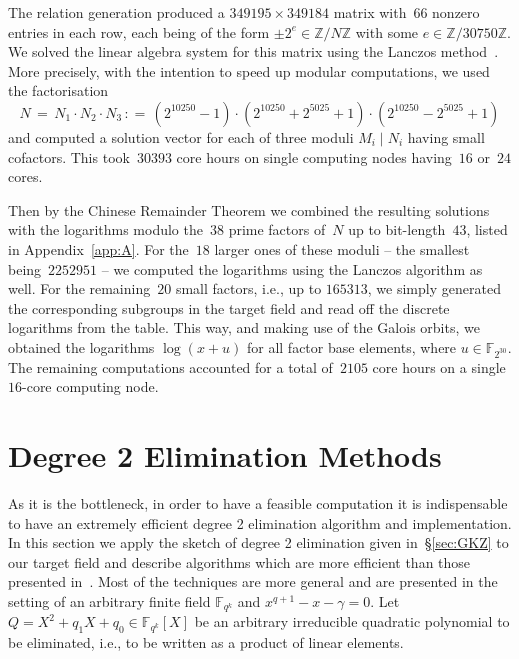 \documentclass[11pt]{llncs}
\newcommand{\Z}{\mathbb Z}
\newcommand{\F}{\mathbb F}
\newcommand{\defeq}{\mathrel{\mathop:}=}
\begin{document}
The relation generation produced a $\num{349195} \times \num{349184}$
matrix with~$66$ nonzero entries in each row, each being of the form
$\pm 2^e \in \Z / N \Z$ with some $e \in \Z / 30750 \Z$.  We solved
the linear algebra system for this matrix using the Lanczos
method~\cite{Lanczos,odlyzko}.  More precisely, with the intention to
speed up modular computations, we used the factorisation
\[ N \,=\, N_1 \cdot N_2 \cdot N_3 \,\defeq\, (2^{10250} - 1) \cdot
  (2^{10250} + 2^{5025} + 1) \cdot (2^{10250} - 2^{5025} + 1) \] and
computed a solution vector for each of three moduli $M_i \mid N_i$
having small cofactors.  This took~$\num{30393}$ core hours on single
computing nodes having~$16$ or~$24$ cores.

Then by the Chinese Remainder Theorem we combined the resulting
solutions with the logarithms modulo the~$38$ prime factors of~$N$ up
to bit-length~$43$, listed in Appendix~\ref{app:A}.  For the~$18$
larger ones of these moduli -- the smallest being~$\num{2252951}$ --
we computed the logarithms using the Lanczos algorithm as well.  For
the remaining~$20$ small factors, i.e., up to $\num{165313}$, we
simply generated the corresponding subgroups in the target field and
read off the discrete logarithms from the table.  This way, and making
use of the Galois orbits, we obtained the logarithms $\log(x + u)$ for
all factor base elements, where $u \in \F_{2^{30}}$.  The remaining
computations accounted for a total of~$\num{2105}$ core hours on a
single $16$-core computing node.


\section{Degree 2 Elimination Methods}\label{sec:degree2}

As it is the bottleneck, in order to have a feasible computation it is indispensable to have an extremely efficient degree 2 elimination
algorithm and implementation.
In this section we apply the sketch of degree 2 elimination given in~\S\ref{sec:GKZ} to our target field
and describe algorithms which are more efficient than those presented in~\cite{GGMZ13b,GKZ14a}.
Most of the techniques are more general and are presented in the setting of
an arbitrary finite field $\F_{q^k}$ and $x^{q+1}-x-\gamma=0$.
Let $Q = X^2 + q_1X + q_0 \in \F_{q^k}[X]$ be an arbitrary irreducible quadratic polynomial to
be eliminated, i.e., to be written as a product of linear elements.
\end{document}
